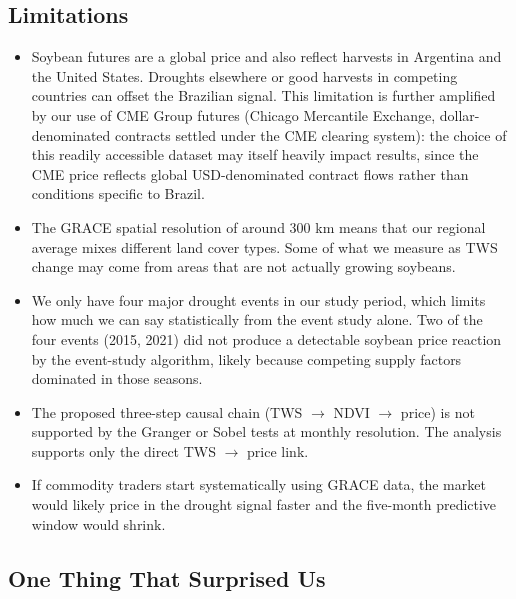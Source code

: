 \documentclass[6pt, twocolumn]{article}
\begin{document}
\subsection{Limitations}

\begin{itemize}
  \item Soybean futures are a global price and also reflect
        harvests in Argentina and the United States. Droughts
        elsewhere or good harvests in competing countries can
        offset the Brazilian signal. This limitation is further
        amplified by our use of CME Group futures (Chicago
        Mercantile Exchange, dollar-denominated contracts settled
        under the CME clearing system): the choice of this readily
        accessible dataset may itself heavily impact results, since
        the CME price reflects global USD-denominated contract
        flows rather than conditions specific to Brazil.
  \item The GRACE spatial resolution of around 300 km means that
        our regional average mixes different land cover types. Some
        of what we measure as TWS change may come from areas that
        are not actually growing soybeans.
  \item We only have four major drought events in our study period,
        which limits how much we can say statistically from the
        event study alone. Two of the four events (2015, 2021) did
        not produce a detectable soybean price reaction by the
        event-study algorithm, likely because competing supply
        factors dominated in those seasons.
  \item The proposed three-step causal chain (TWS $\to$ NDVI $\to$
        price) is not supported by the Granger or Sobel tests at
        monthly resolution. The analysis supports only the direct
        TWS $\to$ price link.
  \item If commodity traders start systematically using GRACE data,
        the market would likely price in the drought signal faster
        and the five-month predictive window would shrink.
\end{itemize}

\subsection{One Thing That Surprised Us}
\end{document}
